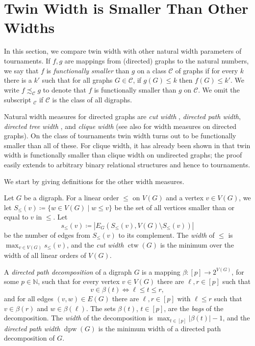 \PassOptionsToPackage{dvipsnames,svgnames}{xcolor}\documentclass[10pt,a4paper]{article}
\newcommand{\CC}{{\mathcal C}}
\newcommand{\NN}{{\mathbb N}}
\DeclareMathOperator{\dpw}{dpw}
\DeclareMathOperator{\ctw}{ctw}
\begin{document}
\section{Twin Width is Smaller Than Other Widths}
\label{sec:widths}

In this section, we compare twin width with other natural width parameters of tournaments.
If $f,g$ are mappings from (directed) graphs to the natural numbers, we say that $f$ is \emph{functionally smaller} than $g$ on a class $\CC$ of graphs if
for every $k$ there is a $k'$ such that for all graphs $G\in\CC$, if $g(G)\le k$ then $f(G)\le k'$.
We write $f\precsim_{\CC}g$ to denote that $f$ is functionally smaller than $g$ on $\CC$.
We omit the subscript ${}_{\CC}$ if $\CC$ is the class of all digraphs.

Natural width measures for directed graphs are \emph{cut width} \cite{ChudnovskyFS12}, \emph{directed path width}, \emph{directed tree width} \cite{JohnsonRST01}, and \emph{clique width} \cite{CourcelleO00} (see also \cite{Rehs22} for width measures on directed graphs).
On the class of tournaments twin width turns out to be functionally smaller than all of these.
For clique width, it has already been shown in \cite{BonnetKTW22} that twin width is functionally smaller than clique width on undirected graphs; the proof easily extends to arbitrary binary relational structures and hence to tournaments.

We start by giving definitions for the other width measures.

Let $G$ be a digraph.
For a linear order $\leq$ on $V(G)$ and a vertex $v \in V(G)$, we let $S_\leq(v) \coloneqq \{w \in V(G) \mid w \leq v\}$ be the set of all vertices smaller than or equal to $v$ in $\leq$.
Let
\[s_\leq(v) \coloneqq |E_G(S_\leq(v),V(G)\setminus S_\leq(v))|\]
be the number of edges from $S_\le(v)$ to its complement.
The \emph{width} of $\leq$ is $\max_{v\in V(G)} s_\leq(v)$, and the \emph{cut width} $\ctw(G)$ is the minimum over the width of all linear orders of $V(G)$.

A \emph{directed path decomposition} of a digraph $G$ is a mapping $\beta\colon[p] \to 2^{V(G)}$, for some $p\in\NN$, such that
for every vertex $v\in V(G)$ there are $\ell,r \in [p]$ such that
\[v \in\beta(t) \iff \ell \leq t \leq r,\]
and for all edges $(v,w)\in E(G)$ there are $\ell,r \in [p]$ with $\ell \leq r$ such that $v \in \beta(r)$ and $w \in \beta(\ell)$.
The sets $\beta(t)$, $t \in [p]$, are the \emph{bags} of the decomposition.
The \emph{width} of the decomposition is $\max_{t \in [p]}|\beta(t)|-1$,
and the \emph{directed path width} $\dpw(G)$ is the minimum width of a directed path decomposition of $G$.
\end{document}
